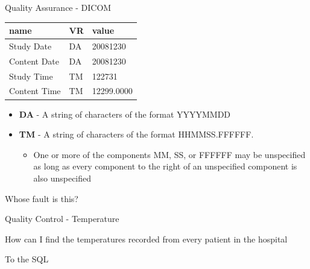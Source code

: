 \documentclass[10pt, xcolor=table]{beamer}
\begin{document}
\begin{frame}{Quality Assurance - DICOM}
\begin{center}
\begin{tabular}{lll}
\toprule
                        name &  VR &                                              value \\
\midrule
                  Study Date &  DA &                                           20081230 \\
                Content Date &  DA &                                           20081230 \\
                  Study Time &  TM &                                             122731 \\
                Content Time &  TM &                                         12299.0000 \\
\bottomrule
\end{tabular}
\end{center}
	\begin{itemize}
		\item \textbf{DA} - A string of characters of the format YYYYMMDD
		\item \textbf{TM} - A string of characters of the format HHMMSS.FFFFFF.  
		\begin{itemize}
			\item One or more of the components MM, SS, or FFFFFF may be unspecified as long as every component to the right of an unspecified component is also unspecified
		\end{itemize}		 
	\end{itemize}

	\begin{center}
		\large{Whose fault is this?}
	\end{center}
\end{frame}

\begin{frame}{Quality Control - Temperature}
	\begin{center}
		\LARGE{How can I find the temperatures recorded from every patient in the hospital}
	\end{center}
\end{frame}


\begin{frame}
	\huge 
	\begin{center}
		To the SQL
	\end{center}
\end{frame}
\end{document}
